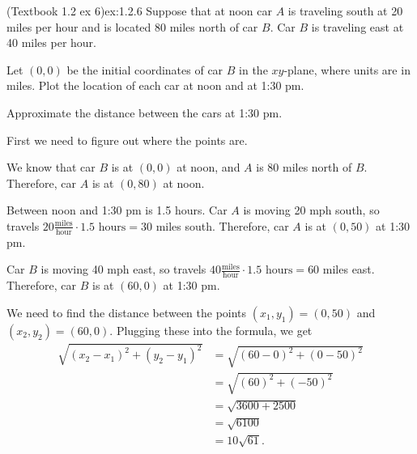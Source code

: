 \documentclass{article}
\begin{document}
\begin{example}{(Textbook 1.2 ex 6)}{ex:1.2.6}
    Suppose that at noon car $A$ is traveling south at 20 miles per hour and is located 80 miles north of car $B$. Car $B$ is traveling east at 40 miles per hour.
    \begin{problem}
        \item Let $(0,0)$ be the initial coordinates of car $B$ in the $xy$-plane, where units are in miles. Plot the location of each car at noon and at 1:30 pm.
        \item Approximate the distance between the cars at 1:30 pm.
    \end{problem}
\end{example}
\begin{solution}
    \begin{problem}
        \item First we need to figure out where the points are.
        
        We know that car $B$ is at $(0,0)$ at noon, and $A$ is 80 miles north of $B$. Therefore, car $A$ is at $(0,80)$ at noon.

        Between noon and 1:30 pm is 1.5 hours. Car $A$ is moving 20 mph south, so travels $20\frac{\text{miles}}{\text{hour}}\cdot 1.5\text{ hours}=30$ miles south. Therefore, car $A$ is at $(0,50)$ at 1:30 pm.

        Car $B$ is moving 40 mph east, so travels $40\frac{\text{miles}}{\text{hour}}\cdot1.5\text{ hours}=60$ miles east. Therefore, car $B$ is at $(60,0)$ at 1:30 pm.
        \begin{center}\end{center}
        \item We need to find the distance between the points $(x_1,y_1)=(0,50)$ and $(x_2,y_2)=(60,0)$. Plugging these into the formula, we get
        \begin{align*}
            \sqrt{(x_2-x_1)^2+(y_2-y_1)^2}&=\sqrt{(60-0)^2+(0-50)^2}\\
            &=\sqrt{(60)^2+(-50)^2}\\
            &=\sqrt{3600+2500}\\
            &=\sqrt{6100}\\
            &=10\sqrt{61}.
        \end{align*}
    \end{problem}
\end{solution}
\end{document}
